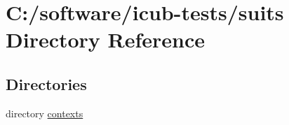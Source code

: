 \section{C\+:/software/icub-\/tests/suits Directory Reference}
\label{dir_84eda685a8a9bfeef7b35e1962b86874}
\subsection*{Directories}
\begin{DoxyCompactItemize}
\item 
directory \hyperlink{dir_f69af4b29e11ba6afb4a6fff3d9a4b7c}{contexts}
\end{DoxyCompactItemize}
